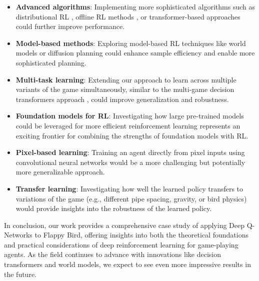 \documentclass[conference]{IEEEtran}
\begin{document}
\begin{itemize}
    \item \textbf{Advanced algorithms}: Implementing more sophisticated algorithms such as distributional RL \cite{dabney2020distributional}, offline RL methods \cite{fujimoto2021minimalist}, or transformer-based approaches \cite{chen2021decision} could further improve performance.
    
    \item \textbf{Model-based methods}: Exploring model-based RL techniques like world models \cite{hafner2023mastering} or diffusion planning \cite{yu2022planning} could enhance sample efficiency and enable more sophisticated planning.
    
    \item \textbf{Multi-task learning}: Extending our approach to learn across multiple variants of the game simultaneously, similar to the multi-game decision transformers approach \cite{lee2022multi}, could improve generalization and robustness.
    
    \item \textbf{Foundation models for RL}: Investigating how large pre-trained models could be leveraged for more efficient reinforcement learning \cite{yang2023foundation} represents an exciting frontier for combining the strengths of foundation models with RL.
    
    \item \textbf{Pixel-based learning}: Training an agent directly from pixel inputs using convolutional neural networks would be a more challenging but potentially more generalizable approach.
    
    \item \textbf{Transfer learning}: Investigating how well the learned policy transfers to variations of the game (e.g., different pipe spacing, gravity, or bird physics) would provide insights into the robustness of the learned policy.
\end{itemize}

In conclusion, our work provides a comprehensive case study of applying Deep Q-Networks to Flappy Bird, offering insights into both the theoretical foundations and practical considerations of deep reinforcement learning for game-playing agents. As the field continues to advance with innovations like decision transformers and world models, we expect to see even more impressive results in the future.



\end{document}
